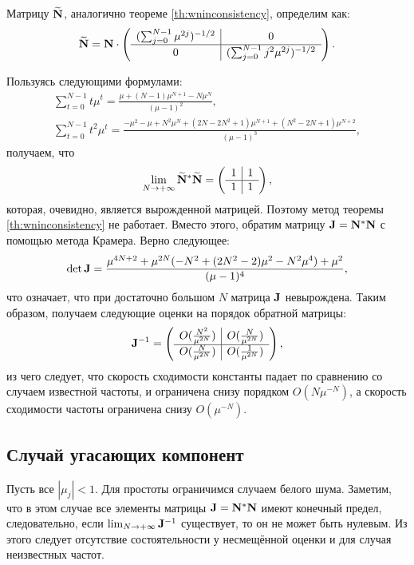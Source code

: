 \documentclass[12pt,a4paper]{article}
\begin{document}
Матрицу $\widetilde {\mathbf{N}}$, аналогично теореме \ref{th:wninconsistency}, определим как:
\begin{equation*}
\widetilde {\mathbf{N}} = \mathbf{N} \cdot \left( \begin{array}{c|c}
(\sum_{j = 0}^{N-1} \mu^{2j})^{-1/2} & 0 \\ \hline
0 & (\sum_{j = 0}^{N-1} j^2 \mu^{2j})^{-1/2}
\end{array}  \right).
\end{equation*}

Пользуясь следующими формулами:
\begin{gather*}
\sum_{t = 0}^{N-1} t \mu^t = \frac{\mu + (N-1)\mu^{N+1} - N \mu^N}{(\mu-1)^2}, \\
\sum_{t = 0}^{N-1} t^2 \mu^t = \frac{-\mu^2 - \mu + N^2 \mu^N + (2N - 2 N^2 + 1) \mu^{N+1}  + (N^2 - 2N + 1) \mu^{N + 2} }{(\mu-1)^3},
\end{gather*}
получаем, что
\begin{equation*}
\lim_{N \to +\infty} \widetilde {\mathbf{N}}^* \widetilde {\mathbf{N}} = \left(\begin{array}{c|c}
1 & 1 \\ \hline
1 & 1
\end{array} \right),
\end{equation*}
которая, очевидно, является вырожденной матрицей. Поэтому метод теоремы \ref{th:wninconsistency} не работает. Вместо этого, обратим матрицу $\mathbf{J} = \mathbf{N}^* \mathbf{N}$ с помощью метода Крамера. Верно следующее:
\begin{equation*}
	\det \mathbf{J} = \frac{\mu^{4N + 2} + \mu^{2N}(-N^2 + (2N^2-2)\mu^2 - N^2\mu^4) + \mu^2}{(\mu-1)^4},
\end{equation*}
что означает, что при достаточно большом $N$ матрица $\mathbf{J}$ невырождена. Таким образом, получаем следующие оценки на порядок обратной матрицы:
\begin{equation*}
\mathbf{J}^{-1} = \left(\begin{array}{c|c}
O(\frac{N^2}{\mu^{2N}}) & O(\frac{N}{\mu^{2N}}) \\ \hline
O(\frac{N}{\mu^{2N}}) & O(\frac{1}{\mu^{2N}})
\end{array} \right),
\end{equation*}
из чего следует, что скорость сходимости константы падает по сравнению со случаем известной частоты, и ограничена снизу порядком $O(N\mu^{-N})$,
а скорость сходимости частоты ограничена снизу $O(\mu^{-N})$.

\subsection{Случай угасающих компонент}
Пусть все $|\mu_j| < 1$. Для простоты ограничимся случаем белого шума. Заметим, что в этом случае все элементы матрицы $\mathbf{J} = \mathbf{N}^* \mathbf{N}$ имеют конечный предел, следовательно, если $\lim_{N \to +\infty} \mathbf{J}^{-1}$ существует, то он не может быть нулевым. Из этого следует отсутствие состоятельности у несмещённой оценки и для случая неизвестных частот.
\end{document}
